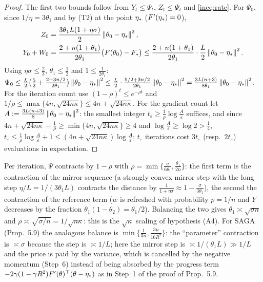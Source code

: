 \begin{proof}
The first two bounds follow from $Y_t\le\Psi_t$, $Z_t\le\Psi_t$ and \eqref{ineq:rate}. For $\Psi_0$, since $1/\eta=3\theta_1$ and by (T2) at the point $\eta_\ast$ ($F'(\eta_\ast)=0$),
\begin{align*}
Z_0&=\frac{3\theta_1L(1+\eta\sigma)}2\left\|\theta_0-\eta_\ast\right\|^2,\\
Y_0+W_0&=\frac{2+n(1+\theta_1)}{2\theta_1}\big(F(\theta_0)-F_\ast\big)\le\frac{2+n(1+\theta_1)}{2\theta_1}\cdot\frac L2\left\|\theta_0-\eta_\ast\right\|^2.
\end{align*}
Using $\eta\sigma\le\frac23$, $\theta_1\le\frac12$ and $1\le\frac1{2\theta_1}$: $\Psi_0\le\frac L2\big(\frac52+\frac{2+3n/2}{2\theta_1}\big)\left\|\theta_0-\eta_\ast\right\|^2\le\frac L2\cdot\frac{9/2+3n/2}{2\theta_1}\left\|\theta_0-\eta_\ast\right\|^2=\frac{3L(n+3)}{8\theta_1}\left\|\theta_0-\eta_\ast\right\|^2$. For the iteration count use $(1-\rho)^t\le e^{-\rho t}$ and $1/\rho\le\max\{4n,\sqrt{24n\kappa}\}\le4n+\sqrt{24n\kappa}$. For the gradient count let $A:=\frac{3L(n+3)}8\left\|\theta_0-\eta_\ast\right\|^2$: the smallest integer $t_\varepsilon\ge\frac1\rho\log\frac A\varepsilon$ suffices, and since $4n+\sqrt{24n\kappa}-\frac1\rho\ge\min\{4n,\sqrt{24n\kappa}\}\ge4$ and $\log\frac A\varepsilon\ge\log2>\frac14$, $t_\varepsilon\le\frac1\rho\log\frac A\varepsilon+1\le(4n+\sqrt{24n\kappa})\log\frac A\varepsilon$; $t_\varepsilon$ iterations cost $3t_\varepsilon$ (resp.\ $2t_\varepsilon$) evaluations in expectation.
\end{proof}

\begin{remark}
Per iteration, $\Psi$ contracts by $1-\rho$ with $\rho=\min\{\frac\sigma{6\theta_1},\frac{\theta_1}{2n}\}$: the first term is the contraction of the mirror sequence (a strongly convex mirror step with the long step $\eta/L=1/(3\theta_1L)$ contracts the distance by $\frac1{1+\eta\sigma}\approx1-\frac{\sigma}{3\theta_1}$), the second the contraction of the reference term ($w$ is refreshed with probability $p=1/n$ and $Y$ decreases by the fraction $\theta_1(1-\theta_2)=\theta_1/2$). Balancing the two gives $\theta_1\asymp\sqrt{\sigma n}$ and $\rho\asymp\sqrt{\sigma/n}=1/\sqrt{n\kappa}$: this is the $\sqrt{\kappa}$ scaling of hypothesis (A4). For SAGA (Prop.~5.9) the analogous balance is $\min\{\frac1{3n},\frac{3\mu}{16R^2}\}$: the ``parameter'' contraction is $\asymp\sigma$ because the step is $\asymp1/L$; here the mirror step is $\asymp1/(\theta_1L)\gg1/L$ and the price is paid by the variance, which is cancelled by the negative momentum (Step~6) instead of being absorbed by the progress term $-2\gamma(1-\gamma R^2)F'(\theta)^\top(\theta-\eta_\ast)$ as in Step~1 of the proof of Prop.~5.9.
\end{remark}

